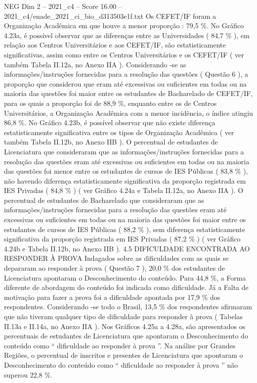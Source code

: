 \begin{textsample}{NEG Dim 2 – 2021\_c4 – Score 16.00 – 2021\_c4/enade\_2021\_ci\_bio\_d313503e1f.txt}
Os CEFET/IF foram a Organização Acadêmica em que houve a menor proporção : 79,5 \%.
No Gráfico 4.23a, é possível observar que as diferenças entre as Universidades ( 84,7 \% ), em relação aos Centros Universitários e aos CEFET/IF, são estatisticamente significativas, assim como entre os Centros Universitários e os CEFET/IF ( ver também Tabela II.12a, no Anexo IIA ).
Considerando -se as informações/instruções fornecidas para a resolução das questões ( Questão 6 ), a proporção que considerou que eram até excessivas ou suficientes em todas ou na maioria das questões foi maior entre os estudantes de Bacharelado de CEFET/IF, para os quais a proporção foi de 88,9 \%, enquanto entre os de Centros Universitários, a Organização Acadêmica com a menor incidência, o índice atingiu 86,8 \%.
No Gráfico 4.23b, é possível observar que não existe diferença estatisticamente significativa entre os tipos de Organização Acadêmica ( ver também Tabela II.12b, no Anexo IIB ).
O percentual de estudantes de Licenciatura que consideraram que as informações/instruções fornecidas para a resolução das questões eram até excessivas ou suficientes em todas ou na maioria das questões foi menor entre os estudantes de cursos de IES Públicas ( 83,8 \% ), não havendo diferença estatisticamente significativa da proporção registrada em IES Privadas ( 84,8 \% ) ( ver Gráfico 4.24a e Tabela II.12a, no Anexo IIA ).
O percentual de estudantes de Bacharelado que consideraram que as informações/instruções fornecidas para a resolução das questões eram até excessivas ou suficientes em todas ou na maioria das questões foi maior entre os estudantes de cursos de IES Públicas ( 88,2 \% ), sem diferença estatisticamente significativa da proporção registrada em IES Privadas ( 87,2 \% ) ( ver Gráfico 4.24b e Tabela II.12b, no Anexo IIB ). 4.5 DIFICULDADE ENCONTRADA AO RESPONDER À PROVA Indagados sobre as dificuldades com as quais se depararam ao responder à prova ( Questão 7 ), 20,0 \% dos estudantes de Licenciatura apontaram o Desconhecimento do conteúdo.
Para 44,8 \%, a Forma diferente de abordagem do conteúdo foi indicada como dificuldade.
Já a Falta de motivação para fazer a prova foi a dificuldade apontada por 17,9 \% dos respondentes.
Considerando -se todo o Brasil, 13,5 \% dos respondentes afirmaram que não tiveram qualquer tipo de dificuldade para responder à prova ( Tabelas II.13a e II.14a, no Anexo IIA ).
Nos Gráficos 4.25a a 4.28a, são apresentados os percentuais de estudantes de Licenciatura que apontaram o Desconhecimento do conteúdo como “ dificuldade ao responder à prova ”.
Na análise por Grandes Regiões, o percentual de inscritos e presentes de Licenciatura que apontaram o Desconhecimento do conteúdo como “ dificuldade ao responder à prova ” não superou 22,8 \%.

\end{textsample}
